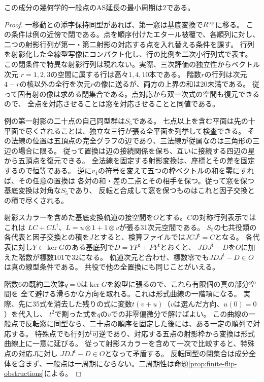 \begin{corollary}[一般最小周期]\label{cor:reversible-generic-period}
この成分の幾何学的一般点のAS延長の最小周期は2である。
\end{corollary}
\begin{proof}
一移動との添字保持同型があれば、第一窓は基底変換で$R^{\rm op}$に移る。
この条件は例の近傍で閉である。点を順序付けたエタール被覆で、各順列に対し、
二つの射影行列が第一・第二射影の対応する点を入れ替える条件を課す。
行列を射影化した全線型写像にコンパクト化し、行の比例を二次小行列式で表す。
この閉条件で特異な射影行列は現れない。実際、三次評価の独立性からベクトル次元
$r=1,2,3$の空間に属する行は高々$1,4,10$本である。
階数$r$の行列は次元$4-r$の核以外の全行を次元$r$の像に送るが、両方の上界の和は20未満である。
従って固有射の像は求める閉集合である。点対応から双一次式の空間も復元できるので、
全点を対応させることは窓を対応させることと同値である。

例の第一射影の二十点の自己同型群は$S_5$である。
七点以上を含む平面は先の十平面で尽くされることは、独立な三行が張る全平面を列挙して検査できる。
その法線の位置は五頂点の完全グラフの辺であり、三法線が従属なのは三角形の三辺の場合に限る。
従って置換は辺の接続関係を保ち、互いに接続する四辺の星から五頂点を復元できる。
全法線を固定する射影変換は、座標とその差を固定するので恒等である。
逆に$v_4$の符号を変えて五つの枠ベクトルの和を零にすれば、その任意の置換は
各対の和・差の二点とその相手を保つ。従って窓を保つ基底変換は対角な$S_5$であり、
反転と合成して窓を保つものはこれと因子交換との積で尽くされる。

射影スカラーを含めた基底変換軌道の接空間を$O$とする。$C$の対称行列表示ではこれは
$LC+CL^{\mathsf t}$、$L=u\otimes1+1\otimes v$が張る31次元空間である。
$S_5$の七共役類の各代表と因子交換との積を$J$とすると、検算ファイルでは$JCJ^{\mathsf t}=C$となる。
各代表に対し$Y\in\ker G$のある基底列で$D=YP^{\mathsf t}+PY^{\mathsf t}$とおくと、
$JDJ^{\mathsf t}-D$を$O$に加えた階数が標数101で32になる。
軌道次元と合わせ、標数零でも$JDJ^{\mathsf t}-D\in O$は真の線型条件である。
共役で他の全置換にも同じことがいえる。

階数6の既約二次錐$q=0$は$\ker G$を線型に張るので、これら有限個の真の部分空間を
全て避ける滑らかな方向を取れる。これは形式曲線の一階項になる。
実際、先に35式を消去した残りの式に変数$t(v+u)$（$v$は選んだ方向、$u(0)=0$）を代入し、
$t^2$で割った式を$q$の$v$での非零偏微分で解けばよい。
この曲線の一般点で反転窓に同型なら、二十点の順序を固定した後には、ある一定の順列で対応する。
特殊点でも行列が可逆であり、対応する五点の射影枠から変換は形式曲線上に一意に延びる。
従って射影スカラーを含めて一次で比較すると、特殊点の対応$J$に対し
$JDJ^{\mathsf t}-D\in O$となって矛盾する。
反転同型の閉集合は成分全体を含まず、一般点は一周期にならない。二周期性は命題\ref{prop:finite-flip-obstructions}による。
\end{proof}

